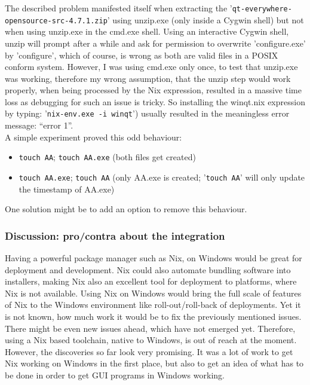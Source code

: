 \documentclass[a4paper,10pt]{article}
\begin{document}
The described problem manifested itself when extracting the '\texttt{qt-everywhere-opensource-src-4.7.1.zip}' using unzip.exe (only inside a Cygwin shell) but not when using unzip.exe in the cmd.exe shell. Using an interactive Cygwin shell, unzip will prompt after a while and ask for permission to overwrite 'configure.exe' by 'configure', which of course, is wrong as both are valid files in a POSIX conform system. However, I was using cmd.exe only once, to test that unzip.exe was working, therefore my wrong assumption, that the unzip step would work properly, when being processed by the Nix expression, resulted in a massive time loss as debugging for such an issue is tricky. So installing the winqt.nix expression by typing: '\texttt{nix-env.exe -i winqt}') usually resulted in the meaningless error message: ``error 1''. \\

A simple experiment proved this odd behaviour: 
\begin{itemize}
 \item \texttt{touch AA}; \texttt{touch AA.exe} (both files get created)
 \item \texttt{touch AA.exe}; \texttt{touch AA} (only AA.exe is created; '\texttt{touch AA}' will only update the timestamp of AA.exe)
\end{itemize}

One solution might be to add an option to remove this behaviour.

\subsubsection*{Discussion: pro/contra about the integration}
Having a powerful package manager such as Nix, on Windows would be great for deployment and development. Nix could also automate bundling software into installers, making Nix also an excellent tool for deployment to platforms, where Nix is not available. Using Nix on Windows would bring the full scale of features of Nix to the Windows environment like roll-out/roll-back of deployments. Yet it is not known, how much work it would be to fix the previously mentioned issues. There might be even new issues ahead, which have not emerged yet. Therefore, using a Nix based toolchain, native to Windows, is out of reach at the moment. However, the discoveries so far look very promising. It was a lot of work to get Nix working on Windows in the first place, but also to get an idea of what has to be done in order to get GUI programs in Windows working.\\ 
\end{document}
